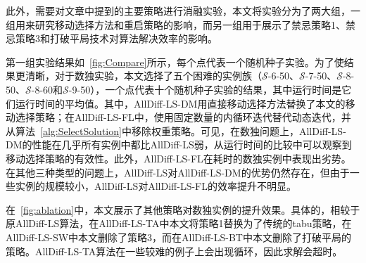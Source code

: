 此外，需要对文章中提到的主要策略进行消融实验，本文将实验分为了两大组，一组用来研究移动选择方法和重启策略的影响，而另一组用于展示了禁忌策略1、禁忌策略3和打破平局技术对算法解决效率的影响。

第一组实验结果如\figurename~\ref{fig:Compare}所示，每个点代表一个随机种子实验。为了使结果更清晰，对于数独实验，本文选择了五个困难的实例族（$\mathcal{S}$-6-50、$\mathcal{S}$-7-50、$\mathcal{S}$-8-50、$\mathcal{S}$-8-60和$\mathcal{S}$-9-50），一个点代表十个随机种子实验的结果，其中运行时间是它们运行时间的平均值。其中，AllDiff-LS-DM用直接移动选择方法替换了本文的移动选择策略；在AllDiff-LS-FL中，使用固定数量的内循环迭代替代动态迭代，并从算法~\ref{alg:SelectSolution}中移除权重策略。可见，在数独问题上，AllDiff-LS-DM的性能在几乎所有实例中都比AllDiff-LS弱，从运行时间的比较中可以观察到移动选择策略的有效性。此外，AllDiff-LS-FL在耗时的数独实例中表现出劣势。在其他三种类型的问题上，AllDiff-LS对AllDiff-LS-DM的优势仍然存在，但由于一些实例的规模较小，AllDiff-LS对AllDiff-LS-FL的效率提升不明显。

在\figurename~\ref{fig:ablation}中，本文展示了其他策略对数独实例的提升效果。具体的，相较于原AllDiff-LS算法，在AllDiff-LS-TA中本文将策略1替换为了传统的tabu策略，在AllDiff-LS-SW中本文删除了策略3，而在AllDiff-LS-BT中本文删除了打破平局的策略。AllDiff-LS-TA算法在一些较难的例子上会出现循环，因此求解会超时。


